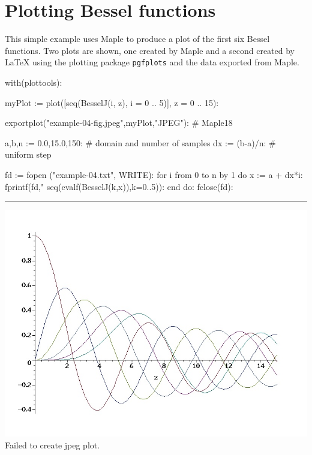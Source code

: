 \documentclass[12pt]{mpllatex}
\begin{document}
\section*{Plotting Bessel functions}

This simple example uses Maple to produce a plot of the first six Bessel functions. Two plots are shown, one created by Maple and a second created by LaTeX using the plotting package {\tt\small pgfplots} and the data exported from Maple.

\begin{maple}
   with(plottools):

   myPlot := plot([seq(BesselJ(i, z), i = 0 .. 5)], z = 0 .. 15):

   exportplot("example-04-fig.jpeg",myPlot,"JPEG"):   # Maple18

   a,b,n := 0.0,15.0,150:           # domain and number of samples
   dx := (b-a)/n:                   # uniform step

   fd := fopen ("example-04.txt", WRITE):
   for i from 0 to n by 1 do
      x := a + dx*i:
      fprintf(fd,"%
                 seq(evalf(BesselJ(k,x)),k=0..5)):
   end do:
   fclose(fd):
\end{maple}

\clearpage

\hrule height0pt
\vfill
\begin{minipage}{\textwidth}
   \centering
   {\includegraphics[width=6.4in]{example-04-fig.jpeg}}{Failed to create jpeg plot.}
\end{minipage}
\vfill
\end{document}
